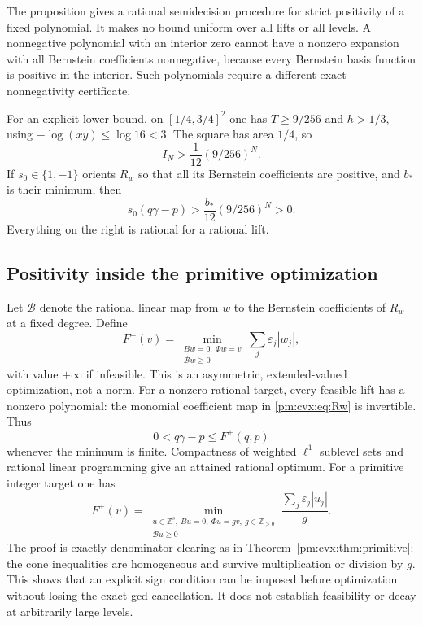 \documentclass[11pt,a4paper]{article}
\newcommand{\Z}{\mathbb Z}
\theoremstyle{definition}
\theoremstyle{remark}
\numberwithin{equation}{section}
\begin{document}
The proposition gives a rational semidecision procedure for strict
positivity of a fixed polynomial.  It makes no bound uniform over
all lifts or all levels.  A nonnegative polynomial with an interior
zero cannot have a nonzero expansion with all Bernstein coefficients
nonnegative, because every Bernstein basis function is positive in
the interior.  Such polynomials require a different exact
nonnegativity certificate.

For an explicit lower bound, on $[1/4,3/4]^2$ one has
$T\ge9/256$ and $h>1/3$, using $-\log(xy)\le\log16<3$.
The square has area $1/4$, so
\begin{equation}\label{pm:cvx:eq:rough-lower}
 I_N>\frac1{12}(9/256)^N.
\end{equation}
If $s_0\in\{1,-1\}$ orients $R_w$ so that all its Bernstein
coefficients are positive, and $b_*$ is their minimum, then
\begin{equation}\label{pm:cvx:eq:sign-lower}
 s_0(q\gamma-p)>\frac{b_*}{12}(9/256)^N>0.
\end{equation}
Everything on the right is rational for a rational lift.

\subsection{Positivity inside the primitive optimization}

Let $\mathcal B$ denote the rational linear map from $w$ to the
Bernstein coefficients of $R_w$ at a fixed degree.  Define
\begin{equation}\label{pm:cvx:eq:F-positive}
 F^+(v)=\min_{\substack{Bw=0,\ \Phi w=v\\\mathcal Bw\ge0}}
                              \sum_j\varepsilon_j|w_j|,
\end{equation}
with value $+\infty$ if infeasible.  This is an asymmetric,
extended-valued optimization, not a norm.  For a nonzero rational
target, every feasible lift has a nonzero polynomial: the monomial
coefficient map in \eqref{pm:cvx:eq:Rw} is invertible.  Thus
\begin{equation}\label{pm:cvx:eq:F-positive-error}
 0<q\gamma-p\le F^+(q,p)
\end{equation}
whenever the minimum is finite.  Compactness of weighted $\ell^1$
sublevel sets and rational linear programming give an attained
rational optimum.  For a primitive integer target one has
\begin{equation}\label{pm:cvx:eq:positive-gcd}
 F^+(v)=
 \min_{\substack{u\in\Z^s,\ Bu=0,\ \Phi u=gv,\ g\in\Z_{>0}
                 \\\mathcal Bu\ge0}}
       \frac{\sum_j\varepsilon_j|u_j|}{g}.
\end{equation}
The proof is exactly denominator clearing as in
Theorem~\ref{pm:cvx:thm:primitive}: the cone inequalities are
homogeneous and survive multiplication or division by $g$.
This shows that an explicit sign condition can be imposed before
optimization without losing the exact gcd cancellation.  It does
not establish feasibility or decay at arbitrarily large levels.
\end{document}
